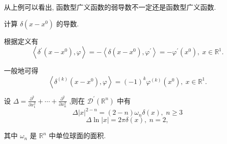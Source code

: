 \documentclass[lang=cn,newtx,10pt,scheme=chinese,thmcnt=chapter]{elegantbook}
\begin{document}
\begin{note}
从上例可以看出, 函数型广义函数的弱导数不一定还是函数型广义函数.
\end{note}
\begin{example}
   计算 \(\delta \left( {x - {x}^{0}}\right)\) 的导数.
\end{example}
\begin{solution}
   根据定义有
\begin{equation*}
\left\langle  {{\delta }^{\prime }\left( {x - {x}^{0}}\right) ,\varphi }\right\rangle   =  - \left\langle  {\delta \left( {x - {x}^{0}}\right) ,{\varphi }^{\prime }}\right\rangle   =  - {\varphi }^{\prime }\left( {x}^{0}\right) ,\;x \in  {\mathbb{R}}^{1}.
\end{equation*}

一般地可得
\begin{equation*}
\left\langle  {{\delta }^{\left( k\right) }\left( {x - {x}^{0}}\right) ,\varphi }\right\rangle   = {\left( -1\right) }^{k}{\varphi }^{\left( k\right) }\left( {x}^{0}\right) ,\;x \in  {\mathbb{R}}^{1}.
\end{equation*}
\end{solution}
\begin{example}
  设 \(\Delta  = \frac{{\partial }^{2}}{\partial {x}_{1}^{2}} + \cdots  + \frac{{\partial }^{2}}{\partial {x}_{n}^{2}}\) ,则在 \({\mathcal{D}}^{\prime }\left( {\mathbb{R}}^{n}\right)\) 中有  \begin{equation*}
  \Delta {\left| x\right| }^{2 - n} = \left( {2 - n}\right) {\omega }_{n}\delta \left( x\right) ,\;n \geq  3
  \end{equation*}
\begin{equation*}
  \Delta \ln \left| x\right|  = {2\pi \delta }\left( x\right) ,\;n = 2,
  \end{equation*}
  
  其中 \({\omega }_{n}\) 是 \({\mathbb{R}}^{n}\) 中单位球面的面积.  
\end{example}
\end{document}
